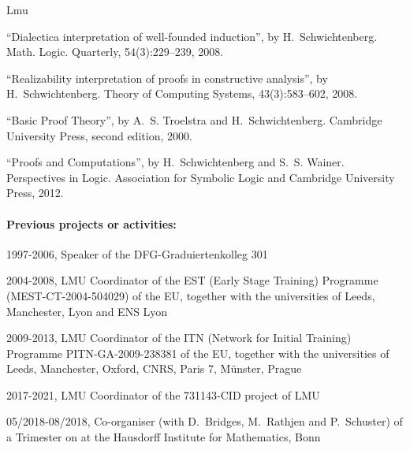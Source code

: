 \begin{sitedescription}{Lmu}
\begin{compactitem}
\item ``Dialectica interpretation of well-founded induction'',
  by H.~Schwichtenberg.
Math. Logic. Quarterly, 54(3):229--239, 2008.

\item ``Realizability interpretation of proofs in constructive analysis'',
  by H.~Schwichtenberg.
 Theory of Computing Systems, 43(3):583--602, 2008.

\item ``Basic Proof Theory'',
  by A.~S. Troelstra and H.~Schwichtenberg.
 Cambridge University Press, second edition, 2000.

\item ``Proofs and Computations'',
  by H.~Schwichtenberg and S.~S. Wainer.
Perspectives in Logic. Association for Symbolic Logic and Cambridge
  University Press, 2012.
\end{compactitem}

\paragraph*{Previous projects or activities:}

\begin{compactitem}
  \item 1997-2006, Speaker of the DFG-Graduiertenkolleg 301

\item 2004-2008, LMU Coordinator of the  EST (Early Stage Training) Programme
   (MEST-CT-2004-504029) of the EU, together with the
universities of Leeds, Manchester, Lyon and ENS Lyon

\item 2009-2013, LMU Coordinator of the ITN (Network for Initial
    Training) Programme PITN-GA-2009-238381  of the
    EU, together with the universities of Leeds, Manchester, Oxford,
    CNRS, Paris 7, M\"unster, Prague

\item 2017-2021, LMU Coordinator of the 731143-CID project of LMU

\item 05/2018-08/2018, Co-organiser (with D.~Bridges, M.~Rathjen and
  P.~Schuster) of a Trimester on 
  at the Hausdorff Institute for Mathematics, Bonn
\end{compactitem}


\end{sitedescription}
